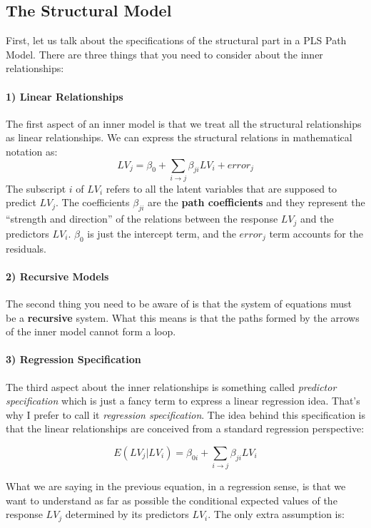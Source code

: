 \documentclass[12pt]{book}\usepackage{graphicx, color}
\begin{document}
\subsection{The Structural Model}
First, let us talk about the specifications of the structural part in a PLS Path Model. There are three things that you need to consider about the inner relationships:

\paragraph{1) Linear Relationships} The first aspect of an inner model is that we treat all the structural relationships as linear relationships. We can express the structural relations in mathematical notation as:
$$ LV_j = \beta_0 + \sum_{i \rightarrow j} \beta_{ji} LV_i + error_j$$
The subscript $i$ of $LV_i$ refers to all the latent variables that are supposed to predict $LV_j$. The coefficients $\beta_{ji}$ are the \textbf{path coefficients} and they represent the ``strength and direction'' of the relations between the response $LV_j$ and the predictors $LV_i$. $\beta_{0}$ is just the intercept term, and the $error_j$ term accounts for the residuals.

\paragraph{2) Recursive Models} The second thing you need to be aware of is that the system of equations must be a \textbf{recursive} system. What this means is that the paths formed by the arrows of the inner model cannot form a loop. 

\paragraph{3) Regression Specification} The third aspect about the inner relationships is something called \textit{predictor specification} which is just a fancy term to express a linear regression idea. That's why I prefer to call it \textit{regression specification}. The idea behind this specification is that the linear relationships are conceived from a standard regression perspective:

$$ E(LV_j | LV_i) = \beta_{0i} + \sum_{i \rightarrow j} \beta_{ji} LV_i $$

What we are saying in the previous equation, in a regression sense, is that we want to understand as far as possible the conditional expected values of the response $LV_j$ determined by its predictors $LV_i$. The only extra assumption is:
\end{document}
